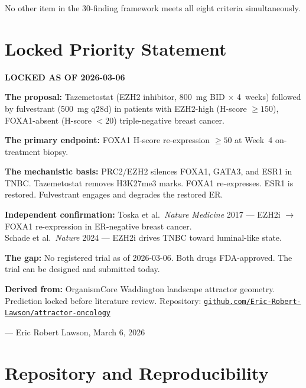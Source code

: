 \documentclass[12pt, a4paper]{article}
\begin{document}
No other item in the 30-finding framework meets all
eight criteria simultaneously.

\section{Locked Priority Statement}

\begin{center}
\colorbox{urgentbox}{
\begin{minipage}{0.88\textwidth}
\vspace{0.6em}
\textbf{LOCKED AS OF 2026-03-06}

\medskip
\textbf{The proposal:}
Tazemetostat (EZH2 inhibitor, 800~mg BID $\times$
4~weeks) followed by fulvestrant (500~mg q28d) in
patients with EZH2-high (H-score $\geq 150$),
FOXA1-absent (H-score $< 20$) triple-negative
breast cancer.

\medskip
\textbf{The primary endpoint:}
FOXA1 H-score re-expression $\geq 50$ at Week~4
on-treatment biopsy.

\medskip
\textbf{The mechanistic basis:}
PRC2/EZH2 silences FOXA1, GATA3, and ESR1 in TNBC.
Tazemetostat removes H3K27me3 marks.
FOXA1 re-expresses. ESR1 is restored.
Fulvestrant engages and degrades the restored ER.

\medskip
\textbf{Independent confirmation:}
Toska et al.\ \textit{Nature Medicine} 2017 ---
EZH2i $\rightarrow$ FOXA1 re-expression in
ER-negative breast cancer.\\
Schade et al.\ \textit{Nature} 2024 ---
EZH2i drives TNBC toward luminal-like state.

\medskip
\textbf{The gap:}
No registered trial as of 2026-03-06.
Both drugs FDA-approved.
The trial can be designed and submitted today.

\medskip
\textbf{Derived from:}
OrganismCore Waddington landscape attractor geometry.
Prediction locked before literature review.
Repository: \href{https://github.com/Eric-Robert-Lawson/attractor-oncology}
{\texttt{github.com/Eric-Robert-Lawson/attractor-oncology}}

\medskip
\hfill --- Eric Robert Lawson, March 6, 2026
\vspace{0.4em}
\end{minipage}
}
\end{center}

\section*{Repository and Reproducibility}
\end{document}
